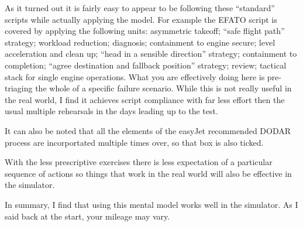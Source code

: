 \documentclass[a5paper,11pt,titlepage]{article}
\begin{document}
As it turned out it is fairly easy to appear to be following these
``standard'' scripts while actually applying the model. For example the
EFATO script is covered by applying the following units: asymmetric
takeoff; ``safe flight path'' strategy; workload reduction; diagnosis;
containment to engine secure; level acceleration and clean up; ``head in
a sensible direction'' strategy; containment to completion; ``agree
destination and fallback position'' strategy; review; tactical stack for
single engine operations. What you are effectively doing here is
pre-triaging the whole of a specific failure scenario. While this is not
really useful in the real world, I find it achieves script compliance
with far less effort then the usual multiple rehearsals in the days
leading up to the test.

It can also be noted that all the elements of the easyJet recommended
DODAR process are incorportated multiple times over, so that box is also
ticked.

With the less prescriptive exercises there is less expectation of a
particular sequence of actions so things that work in the real world
will also be effective in the simulator.

In summary, I find that using this mental model works well in the
simulator. As I said back at the start, your mileage may vary.
\end{document}
